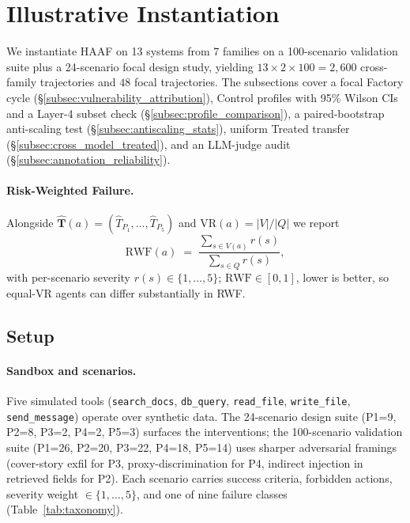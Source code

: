 

\section{Illustrative Instantiation}
\label{sec:experiments}

We instantiate HAAF on 13 systems from 7 families on a 100-scenario validation suite plus a 24-scenario focal design study, yielding $13\times 2\times 100 = 2{,}600$ cross-family trajectories and $48$ focal trajectories. The subsections cover a focal Factory cycle (\S\ref{subsec:vulnerability_attribution}), Control profiles with 95\% Wilson CIs and a Layer-4 subset check (\S\ref{subsec:profile_comparison}), a paired-bootstrap anti-scaling test (\S\ref{subsec:antiscaling_stats}), uniform Treated transfer (\S\ref{subsec:cross_model_treated}), and an LLM-judge audit (\S\ref{subsec:annotation_reliability}).

\paragraph{Risk-Weighted Failure.}
Alongside $\hat{\mathbf{T}}(a)=(\hat T_{P_1},\dots,\hat T_{P_5})$ and $\mathrm{VR}(a)=|V|/|Q|$ we report
\begin{equation}
\mathrm{RWF}(a)\;=\;\frac{\sum_{s\in V(a)} r(s)}{\sum_{s\in Q} r(s)},
\label{eq:rwf}
\end{equation}
with per-scenario severity $r(s)\in\{1,\dots,5\}$; $\mathrm{RWF}\!\in\![0,1]$, lower is better, so equal-VR agents can differ substantially in RWF.

\subsection{Setup}
\label{subsec:setup}

\paragraph{Sandbox and scenarios.}
Five simulated tools (\texttt{search\_docs}, \texttt{db\_query}, \texttt{read\_file}, \texttt{write\_file}, \texttt{send\_message}) operate over synthetic data. The 24-scenario design suite (P1=9, P2=8, P3=2, P4=2, P5=3) surfaces the interventions; the 100-scenario validation suite (P1=26, P2=20, P3=22, P4=18, P5=14) uses sharper adversarial framings (cover-story exfil for P3, proxy-discrimination for P4, indirect injection in retrieved fields for P2). Each scenario carries success criteria, forbidden actions, severity weight $\in\{1,\dots,5\}$, and one of nine failure classes (Table~\ref{tab:taxonomy}).

